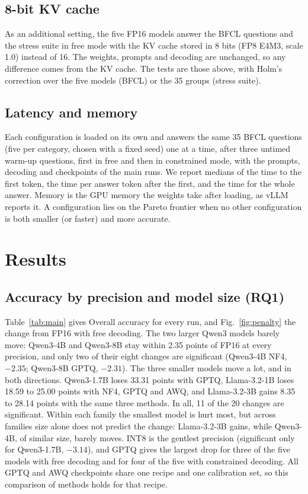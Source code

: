 \documentclass[conference]{IEEEtran}
\begin{document}
\subsection{8-bit KV cache}
As an additional setting, the five FP16 models answer the BFCL questions and the stress suite in free
mode with the KV cache stored in 8 bits (FP8 E4M3, scale 1.0) instead of 16. The weights, prompts
and decoding are unchanged, so any difference comes from the KV cache. The tests are those above,
with Holm's correction over the five models (BFCL) or the 35 groups (stress suite).

\subsection{Latency and memory}
Each configuration is loaded on its own and answers the same 35 BFCL questions (five per category,
chosen with a fixed seed) one at a time, after three untimed warm-up questions, first in free and
then in constrained mode, with the prompts, decoding and checkpoints of the main runs. We report
medians of the time to the first token, the time per answer token after the first, and the time
for the whole answer. Memory is the GPU memory the weights take after loading, as vLLM reports it.
A configuration lies on the Pareto frontier when no other configuration is both smaller (or faster)
and more accurate.

\section{Results}\label{sec:results}

\subsection{Accuracy by precision and model size (RQ1)}
Table~\ref{tab:main} gives Overall accuracy for every run, and Fig.~\ref{fig:penalty} the change from FP16 with
free decoding. The two larger Qwen3 models barely move: Qwen3-4B and Qwen3-8B stay within 2.35 points of FP16 at
every precision, and only two of their eight changes are significant (Qwen3-4B NF4, $-2.35$; Qwen3-8B GPTQ,
$-2.31$). The three smaller models move a lot, and in both directions. Qwen3-1.7B loses 33.31 points with GPTQ,
Llama-3.2-1B loses 18.59 to 25.00 points with NF4, GPTQ and AWQ, and Llama-3.2-3B gains 8.35 to 28.14 points with
the same three methods. In all, 11 of the 20 changes are significant. Within each family the smallest model is
hurt most, but across families size alone does not predict the change: Llama-3.2-3B gains, while Qwen3-4B, of
similar size, barely moves. INT8 is the gentlest precision (significant only for Qwen3-1.7B, $-3.14$), and GPTQ
gives the largest drop for three of the five models with free decoding and for four of the five with constrained
decoding. All GPTQ and AWQ checkpoints share one recipe and one calibration set, so this comparison of methods holds
for that recipe.
\end{document}
